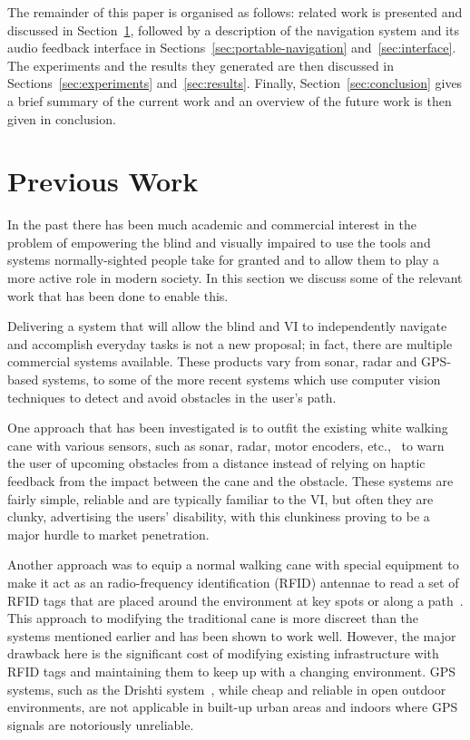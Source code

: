 \documentclass[format=sigconf, review=true, screen=true, anonymous=true]{acmart}
\begin{document}
The remainder of this paper is organised as follows: related work is presented and discussed in Section~\ref{sec:lit-review}, followed by a description of the navigation system and its audio feedback interface in Sections~\ref{sec:portable-navigation} and~\ref{sec:interface}. The experiments and the results they generated are then discussed in Sections~\ref{sec:experiments} and~\ref{sec:results}. Finally, Section~\ref{sec:conclusion} gives a brief summary of the current work and an overview of the future work is then given in conclusion. 

\section{Previous Work}
\label{sec:lit-review}

In the past there has been much academic and commercial interest in the problem of empowering the blind and visually impaired to use the tools and systems normally-sighted people take for granted and to allow them to play a more active role in modern society. In this section we discuss some of the relevant work that has been done to enable this. 


Delivering a system that will allow the blind and VI to independently navigate and accomplish everyday tasks is not a new proposal; in fact, there are multiple commercial systems available. These products vary from sonar, radar and GPS-based systems, to some of the more recent systems which use computer vision techniques to detect and avoid obstacles in the user's path. 

One approach that has been investigated is to outfit the existing white walking cane with various sensors, such as sonar, radar, motor encoders, etc.,~\cite{ulrich1997, marion2008batcane} to warn the user of upcoming obstacles from a distance instead of relying on haptic feedback from the impact between the cane and the obstacle. These systems are fairly simple, reliable and are typically familiar to the VI, but often they are clunky, advertising the users' disability, with this clunkiness proving to be a major hurdle to market penetration. 

Another approach was to equip a normal walking cane with special equipment to make it act as an radio-frequency identification (RFID) antennae to read a set of RFID tags that are placed around the environment at key spots or along a path~\cite{faria2010electronic, willis2005}. This approach to modifying the traditional cane is more discreet than the systems mentioned earlier and has been shown to work well. However, the major drawback here is the significant cost of modifying existing infrastructure with RFID tags and maintaining them to keep up with a changing environment. GPS systems, such as the Drishti system~\cite{ran2004drishti}, while cheap and reliable in open outdoor environments, are not applicable in built-up urban areas and indoors where GPS signals are notoriously unreliable. 
\end{document}
